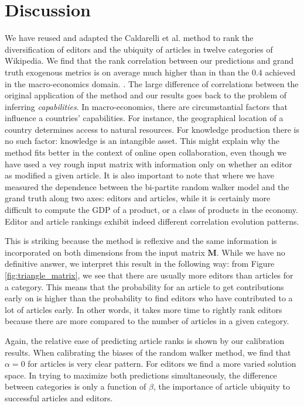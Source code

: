 \section{Discussion}
We have reused and adapted the Caldarelli et al. \cite{caldarelli2012networks} method to rank the diversification of editors and the ubiquity of articles in twelve categories of Wikipedia. We find that the rank correlation between our predictions and grand truth exogenous metrics is on average much higher than in than the $0.4$ achieved in the macro-economics domain. \cite{caldarelli2012networks}. The large difference of correlations between the original application of the method and our results goes back to the problem of inferring {\it capabilities}. In macro-economics, there are circumstantial factors that influence a countries' capabilities. For instance, the geographical location of a country determines access to natural resources. For knowledge production there is no such factor: knowledge is an intangible asset. This might explain why the method fits better in the context of online open collaboration, even though we have used a vey rough input matrix with information only on whether an editor as modified a given article. It is also important to note that where we have measured the dependence between the bi-partite random walker model and the grand truth along two axes: editors and articles, while it is certainly more difficult to compute the GDP of a product, or a class of products in the economy. Editor and article rankings exhibit indeed different correlation evolution patterns. 

This is striking because the method is reflexive and the same information is incorporated on both dimensions from the input matrix $\mathbf{M}$. While we have no definitive answer, we interpret this result in the following way: from Figure \ref{fig:triangle_matrix}, we see that there are usually more editors than articles for a category. This means that the probability for an article to get contributions early on is higher than the probability to find editors who have contributed to a lot of articles early. In other words, it takes more time to rightly rank editors because there are more compared to the number of articles in a given category.

Again, the relative ease of predicting article ranks is shown by our calibration results. When calibrating the biases of the random walker method, we find that $\alpha=0$ for articles is very clear pattern. For editors we find a more varied solution space. In trying to maximize both predictions simultaneously, the difference between categories is only a function of $\beta$, the importance of article ubiquity to successful articles and editors. 

